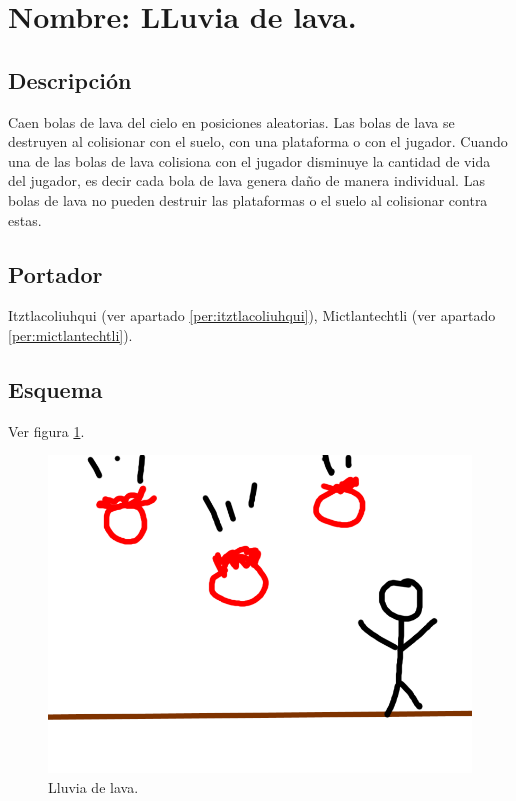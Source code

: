 \section{Nombre: LLuvia de lava.} \label{hab.LLuviaLava}
\subsection{Descripción}
Caen bolas de lava del cielo en posiciones aleatorias. Las bolas de lava se destruyen al colisionar con el suelo, con una plataforma o con el jugador. Cuando una de las bolas de lava colisiona con el jugador disminuye la cantidad de vida del jugador, es decir cada bola de lava genera daño de manera individual. Las bolas de lava no pueden destruir las plataformas o el suelo al colisionar contra estas.
\subsection{Portador}
Itztlacoliuhqui (ver apartado \ref{per:itztlacoliuhqui}), Mictlantechtli (ver apartado \ref{per:mictlantechtli}).	
\subsection{Esquema}	
			Ver figura \ref{fig:lluviaL}.
			\begin{figure}
				\centering
				\includegraphics[height=0.2 \textheight]{Imagenes/lluviaL}
				\caption{Lluvia de lava.}
				\label{fig:lluviaL}
			\end{figure}